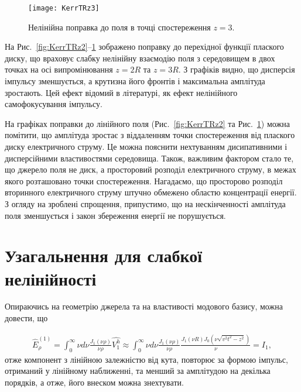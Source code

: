 \begin{figure}[htbp] \begin{center}
\texttt{[image: KerrTRz3]}
\caption{Нелінійна поправка до поля в точці спостереження $ z = 3 $.} 
\label{fig:KerrTRz3}
\end{center} \end{figure}

На Рис.~\ref{fig:KerrTRz2}--\ref{fig:KerrTRz3} зображено поправку
до перехідної функції плаского диску, що враховує слабку нелінійну взаємодію 
поля з середовищем в двох точках на осі випромінювання $ z = 2R $ та $ z = 3R $.
З графіків видно, що дисперсія імпульсу зменшується, а крутизна його фронтів і
максимальна амплітуда зростають. Цей ефект відомий в літературі, як ефект 
нелінійного самофокусування імпульсу.

На графіках поправки до лінійного поля (Рис.~\ref{fig:KerrTRz2} та 
Рис.~\ref{fig:KerrTRz3}) можна помітити, що амплітуда зростає з віддаленням 
точки спостереження від плаского диску електричного струму. Це можна 
пояснити нехтуванням дисипативними і дисперсійними властивостями 
середовища. Також, важливим фактором стало те, що джерело поля не диск, 
а просторовий розподіл електричного струму, в межах якого розташовано точки 
спостереження. Нагадаємо, що просторово розподіл вторинного електричного 
струму штучно обмежено областю концентрації енергії. З огляду на зроблені 
спрощення, припустимо, що на нескінченності амплітуда поля зменшується і 
закон збереження енергії не порушується.

\section{Узагальнення для слабкої нелінійності}

Опираючись на геометрію джерела та на властивості модового базису, можна 
довести, що 

\begin{equation} \begin{aligned}
\hat{E}_\rho^{(1)} = \int_0^\infty \nu d \nu 
\frac{J_1(\nu \rho)}{\nu \rho} \hat{V_1^h} \approx
\int_0^\infty \nu d \nu \frac{J_1(\nu \rho)}{\nu \rho} 
\frac{J_1(\nu R) J_0(\nu \sqrt{v^2t^2-z^2})}{\nu} = I_1,
\end{aligned} \end{equation}
%
отже компонент з лінійною залежністю від кута, повторює за формою 
імпульс, отриманий у лінійному наближенні, та менший за амплітудою на 
декілька порядків, а отже, його внеском можна знехтувати.


